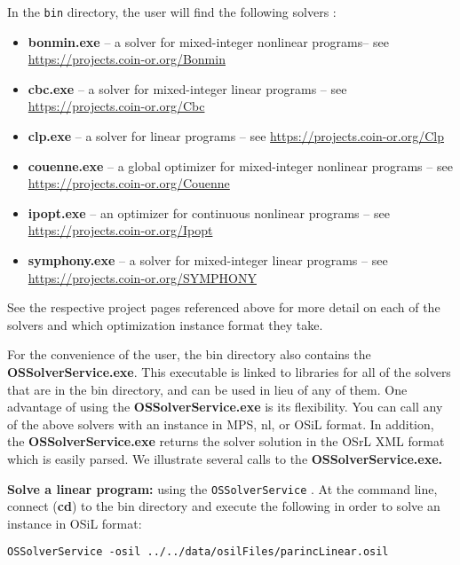 \documentclass[11pt]{article}
\renewcommand{\_}{{\char"5F}}
\renewcommand{\{}{{\char"7B}}
\renewcommand{\}}{{\char"7D}}
\renewcommand{\^}{{\char"0D}}
\renewcommand{\'}{{\char"0D}}
\begin{document}
In the {\tt bin} directory, the user will find the following solvers :
\begin{itemize}
\item {\bf bonmin.exe} -- a solver for mixed-integer nonlinear programs-- see \url{https://projects.coin-or.org/Bonmin}

\item {\bf cbc.exe} --  a solver for mixed-integer linear programs --  see \url{https://projects.coin-or.org/Cbc}

\item {\bf clp.exe} -- a solver for linear programs  -- see \url{https://projects.coin-or.org/Clp}

\item {\bf couenne.exe} -- a global optimizer for mixed-integer nonlinear programs  -- see \url{https://projects.coin-or.org/Couenne}

\item {\bf ipopt.exe} -- an optimizer for continuous nonlinear programs -- see \url{https://projects.coin-or.org/Ipopt}

\item {\bf symphony.exe} -- a solver for mixed-integer linear programs -- see \url{https://projects.coin-or.org/SYMPHONY}
\end{itemize}

See the respective project pages referenced above for  more detail on each of the solvers and which optimization instance format they take.

For the convenience of the user, the bin directory also contains the {\bf OSSolverService.exe}.  This executable is linked to libraries for all of the  solvers that are in the bin directory, and can be used in lieu of any of them. One advantage of using the {\bf OSSolverService.exe}  is its flexibility. You can call any of the above solvers with an instance in MPS, nl, or OSiL format.   In addition, the {\bf OSSolverService.exe} returns the solver solution in the OSrL XML format which is easily parsed.  We illustrate several calls to the {\bf OSSolverService.exe.}


{\bf Solve a  linear program:}  using the  {\tt OSSolverService} .  At the command line,  connect ({\bf cd}) to the bin directory and execute the following in order to solve an instance in OSiL format:




\begin{verbatim}
OSSolverService -osil ../../data/osilFiles/parincLinear.osil
\end{verbatim}
\end{document}
